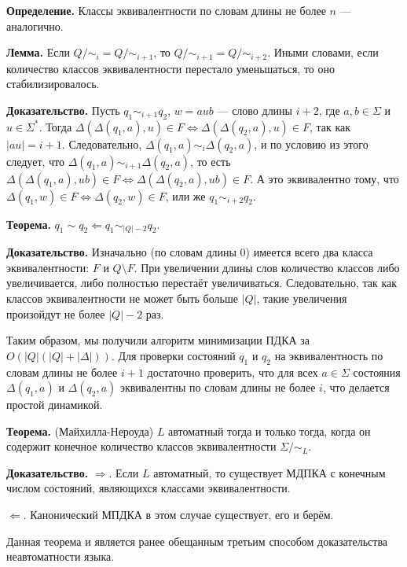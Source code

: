 \textbf{Определение.} Классы эквивалентности по словам длины не более $n$ --- аналогично.

\textbf{Лемма.} Если $Q/\sim_i = Q/\sim_{i+1}$, то $Q/\sim_{i+1} = Q/\sim_{i+2}$.
Иными словами, если количество классов эквивалентности перестало уменьшаться, то оно стабилизировалось.

\textbf{Доказательство.} Пусть $q_1 \sim_{i+1} q_2$, $w = aub$ --- слово длины $i + 2$, где $a, b \in \Sigma$ и $u \in \Sigma^*$.
Тогда $\Delta(\Delta(q_1, a), u) \in F \iff \Delta(\Delta(q_2, a), u) \in F$, так как $|au| = i + 1$.
Следовательно, $\Delta(q_1, a) \sim_i \Delta(q_2, a)$, и по условию из этого следует, что $\Delta(q_1, a) \sim_{i+1} \Delta(q_2, a)$, то есть $\Delta(\Delta(q_1, a), ub) \in F \iff \Delta(\Delta(q_2, a), ub) \in F$.
А это эквивалентно тому, что $\Delta(q_1, w) \in F \iff \Delta(q_2, w) \in F$, или же $q_1 \sim_{i+2} q_2$.

\QED

\textbf{Теорема.} $q_1 \sim q_2 \Leftarrow q_1 \sim_{|Q| - 2} q_2$.

\textbf{Доказательство.} Изначально (по словам длины 0) имеется всего два класса эквивалентности: $F$ и $Q \setminus F$.
При увеличении длины слов количество классов либо увеличивается, либо полностью перестаёт увеличиваться.
Следовательно, так как классов эквивалентности не может быть больше $|Q|$, такие увеличения произойдут не более $|Q| - 2$ раз.

\QED

\sloppy Таким образом, мы получили алгоритм минимизации ПДКА за $O(|Q| (|Q| + |\Delta|))$. 
Для проверки состояний $q_1$ и $q_2$ на эквивалентность по словам длины не более $i + 1$ достаточно проверить, что для всех $a \in \Sigma$ состояния $\Delta(q_1, a)$ и $\Delta(q_2, a)$ эквивалентны по словам длины не более $i$, что делается простой динамикой.

\textbf{Теорема.} (Майхилла-Нероуда) $L$ автоматный тогда и только тогда, когда он содержит конечное количество классов эквивалентности $\Sigma/\sim_L$.

\textbf{Доказательство.} $\Rightarrow$. Если $L$ автоматный, то существует МДПКА с конечным числом состояний, являющихся классами эквивалентности.

$\Leftarrow$. Канонический МПДКА в этом случае существует, его и берём.

\QED

Данная теорема и является ранее обещанным третьим способом доказательства неавтоматности языка.

